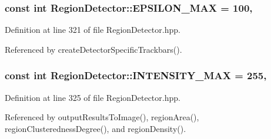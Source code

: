 \hypertarget{classmultiscale_1_1analysis_1_1RegionDetector_a724d57c0db65696f2ddab415deb1138d}{
\subsubsection[{E\-P\-S\-I\-L\-O\-N\-\_\-\-M\-A\-X}]{\setlength{\rightskip}{0pt plus 5cm}const int Region\-Detector\-::\-E\-P\-S\-I\-L\-O\-N\-\_\-\-M\-A\-X = 100\hspace{0.3cm}{\ttfamily [static]}, {\ttfamily [private]}}}\label{classmultiscale_1_1analysis_1_1RegionDetector_a724d57c0db65696f2ddab415deb1138d}


Definition at line 321 of file Region\-Detector.\-hpp.



Referenced by create\-Detector\-Specific\-Trackbars().

\hypertarget{classmultiscale_1_1analysis_1_1RegionDetector_a3b682d43cd686a8bdfce91b0cbbf5245}{
\subsubsection[{I\-N\-T\-E\-N\-S\-I\-T\-Y\-\_\-\-M\-A\-X}]{\setlength{\rightskip}{0pt plus 5cm}const int Region\-Detector\-::\-I\-N\-T\-E\-N\-S\-I\-T\-Y\-\_\-\-M\-A\-X = 255\hspace{0.3cm}{\ttfamily [static]}, {\ttfamily [private]}}}\label{classmultiscale_1_1analysis_1_1RegionDetector_a3b682d43cd686a8bdfce91b0cbbf5245}


Definition at line 325 of file Region\-Detector.\-hpp.



Referenced by output\-Results\-To\-Image(), region\-Area(), region\-Clusteredness\-Degree(), and region\-Density().

